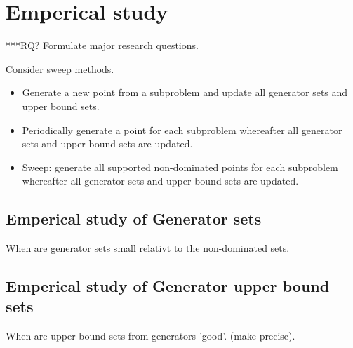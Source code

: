 \section{Emperical study}
***RQ? Formulate major research questions.

Consider sweep methods. 
\begin{itemize}
	\item 
Generate a new point from a subproblem and update all generator sets and upper bound sets.
	\item 
Periodically generate a point for each subproblem whereafter all generator sets and upper bound sets are updated.
	\item 
Sweep: generate all supported non-dominated points for each subproblem whereafter all generator sets and upper bound sets are updated.
\end{itemize}


\subsection{Emperical study of Generator sets}
When are generator sets small relativt to the non-dominated sets.

\subsection{Emperical study of Generator upper bound sets}
When are upper bound sets from generators 'good'. (make precise).

	
